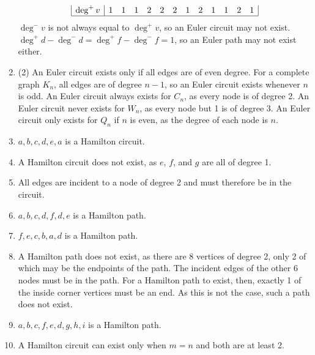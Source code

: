 \documentclass[12pt, A4]{article}
\newcommand{\enumset}[1]{\setcounter{enumi}{#1}}
\begin{document}
\begin{enumerate}
\[\begin{array}{|c|*{12}{c}|}
						\deg^+v & 1 & 1 & 1 & 2 & 2 & 2 & 1 & 2 & 1 & 1 & 2 & 1 \\\hline
					\end{array}\]
					\(\deg^-v\) is not always equal to \(\deg^+v\), so an Euler circuit may not exist. \(\deg^+d - \deg^-d = \deg^+f - \deg^-f = 1\), so an Euler path may not exist either. \\
				\enumset{25}
				\item
					\begin{tasks}(2)
						\task	
							An Euler circuit exists only if all edges are of even degree. For a complete graph \(K_n\), all edges are of degree \(n - 1\), so an Euler circuit exists whenever \(n\) is odd.
						\task
							An Euler circuit always exists for \(C_n\), as every node is of degree 2.
						\task
							An Euler circuit never exists for \(W_n\), as every node but 1 is of degree 3.
						\task
							An Euler circuit only exists for \(Q_n\) if \(n\) is even, as the degree of each node is \(n\).
					\end{tasks}
				\enumset{30}
				\item
					\(a, b, c, d, e, a\) is a Hamilton circuit.
				\enumset{32}
				\item
					A Hamilton circuit does not exist, as \(e\), \(f\), and \(g\) are all of degree 1.
				\enumset{34}
				\item
					All edges are incident to a node of degree 2 and must therefore be in the circuit.
				\enumset{36}
				\item
					\(a, b, c, d, f, d, e\) is a Hamilton path.
				\enumset{38}
				\item
					\(f, e, c, b, a, d\) is a Hamilton path.
				\enumset{40}
				\item
					A Hamilton path does not exist, as there are 8 vertices of degree 2, only 2 of which may be the endpoints of the path. The incident edges of the other 6 nodes must be in the path. For a Hamilton path to exist, then, exactly 1 of the inside corner vertices must be an end. As this is not the case, such a path does not exist.
				\enumset{42}
				\item
					\(a, b, c, f, e, d, g, h, i\) is a Hamilton path.
				\enumset{44}
				\item
					A Hamilton circuit can exist only when \(m = n\) and both are at least 2.
			\end{enumerate}
\end{document}
